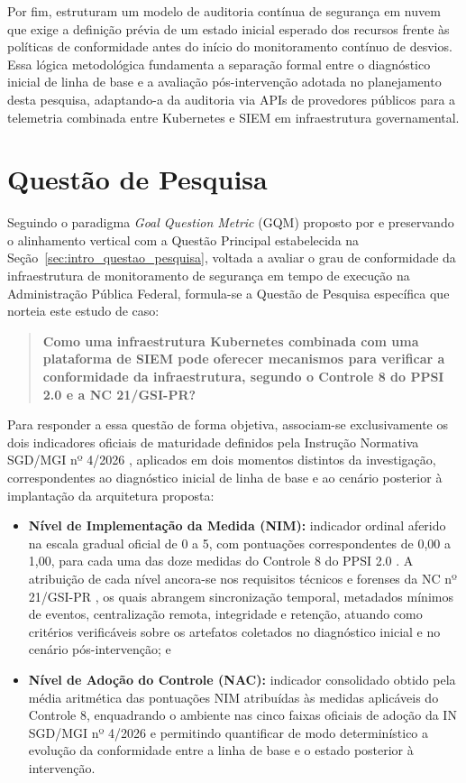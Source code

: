 Por fim,  estruturam um modelo de auditoria contínua de segurança em nuvem que exige a definição prévia de um estado inicial esperado dos recursos frente às políticas de conformidade antes do início do monitoramento contínuo de desvios. Essa lógica metodológica fundamenta a separação formal entre o diagnóstico inicial de linha de base e a avaliação pós-intervenção adotada no planejamento desta pesquisa, adaptando-a da auditoria via APIs de provedores públicos para a telemetria combinada entre Kubernetes e SIEM em infraestrutura governamental.

\section{Questão de Pesquisa}
\label{sec:ec_questao_pesquisa}

Seguindo o paradigma \textit{Goal Question Metric} (GQM) proposto por  e preservando o alinhamento vertical com a Questão Principal estabelecida na Seção~\ref{sec:intro_questao_pesquisa}, voltada a avaliar o grau de conformidade da infraestrutura de monitoramento de segurança em tempo de execução na Administração Pública Federal, formula-se a Questão de Pesquisa específica que norteia este estudo de caso:

\begin{quote}
\textbf{Como uma infraestrutura Kubernetes combinada com uma plataforma de SIEM pode oferecer mecanismos para verificar a conformidade da infraestrutura, segundo o Controle 8 do PPSI 2.0 e a NC 21/GSI-PR?}
\end{quote}

Para responder a essa questão de forma objetiva, associam-se exclusivamente os dois indicadores oficiais de maturidade definidos pela Instrução Normativa SGD/MGI nº 4/2026 \cite{in4_2026}, aplicados em dois momentos distintos da investigação, correspondentes ao diagnóstico inicial de linha de base e ao cenário posterior à implantação da arquitetura proposta:
\begin{itemize}
    \item \textbf{Nível de Implementação da Medida (NIM):} indicador ordinal aferido na escala gradual oficial de 0 a 5, com pontuações correspondentes de 0,00 a 1,00, para cada uma das doze medidas do Controle 8 do PPSI 2.0 \cite{ppsi2026,in4_2026}. A atribuição de cada nível ancora-se nos requisitos técnicos e forenses da NC nº 21/GSI-PR \cite{nc21_2014}, os quais abrangem sincronização temporal, metadados mínimos de eventos, centralização remota, integridade e retenção, atuando como critérios verificáveis sobre os artefatos coletados no diagnóstico inicial e no cenário pós-intervenção; e
    \item \textbf{Nível de Adoção do Controle (NAC):} indicador consolidado obtido pela média aritmética das pontuações NIM atribuídas às medidas aplicáveis do Controle 8, enquadrando o ambiente nas cinco faixas oficiais de adoção da IN SGD/MGI nº 4/2026 \cite{in4_2026} e permitindo quantificar de modo determinístico a evolução da conformidade entre a linha de base e o estado posterior à intervenção.
\end{itemize}

